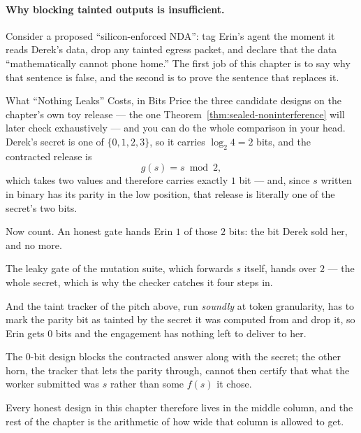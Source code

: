 \documentclass[11pt,a4paper]{article}
\theoremstyle{definition}
\begin{document}
\paragraph{Why blocking tainted outputs is insufficient.}
Consider a proposed ``silicon-enforced NDA'': tag Erin's agent the moment it
reads Derek's data, drop any tainted egress packet, and declare that the data
``mathematically cannot phone home.'' The first job of this chapter is to say
why that sentence is false, and the second is to prove the sentence that
replaces it.
\begin{pdexample}{What ``Nothing Leaks'' Costs, in Bits}
\setlength{\parskip}{4pt plus 1pt}
Price the three candidate designs on the chapter's own toy release --- the one
Theorem~\ref{thm:sealed-noninterference} will later check exhaustively --- and
you can do the whole comparison in your head. Derek's secret is one of
$\{0,1,2,3\}$, so it carries $\log_2 4 = 2$ bits, and the contracted release is
\[
g(s)=s\bmod 2,
\]
which takes two values and therefore carries exactly $1$ bit
--- and, since $s$ written in binary has its parity in the low position, that
release is literally one of the secret's two bits.

Now count. An honest gate
hands Erin $1$ of those $2$ bits: the bit Derek sold her, and no more.

The leaky gate of the mutation suite, which forwards $s$ itself, hands over $2$ ---
the whole secret, which is why the checker catches it four steps in.

And the taint tracker of the pitch above, run \emph{soundly} at token granularity, has
to mark the parity bit as tainted by the secret it was computed from and drop
it, so Erin gets $0$ bits and the engagement has nothing left to deliver to
her.

The $0$-bit design blocks the contracted answer along with the secret; the
other horn, the tracker that lets the parity through, cannot then certify that
what the worker submitted was $s$ rather than some $f(s)$ it chose.

Every honest design in this chapter therefore lives in the middle column, and the
rest of the chapter is the arithmetic of how wide that column is allowed to
get.
\end{pdexample}
\end{document}
